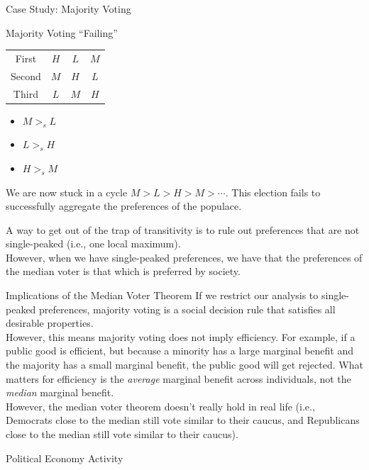 \documentclass[8pt]{extarticle}
\begin{document}
\begin{problem}{Case Study: Majority Voting}
\begin{problem}{Majority Voting ``Failing''}
\begin{center}
\begin{tabular}{c|c|c|c|}
          \cline{2-4}
          First & $H$ & $L$ & $M$\\
          \cline{2-4}
          Second & $M$ & $H$ & $L$\\
          \cline{2-4}
          Third & $L$ & $M$ & $H$\\
          \cline{2-4}
        \end{tabular}
      \end{center}
      \begin{itemize}
        \item $M >_s L$
        \item $L >_s H$
        \item $H >_s M$
      \end{itemize}
      We are now stuck in a cycle $M>L>H>M>\cdots$. This election fails to successfully aggregate the preferences of the populace.
    \end{problem}
    A way to get out of the trap of transitivity is to rule out preferences that are not single-peaked (i.e., one local maximum).\\

    However, when we have single-peaked preferences, we have that the preferences of the median voter is that which is preferred by society.
  \end{problem}
  \begin{problem}{Implications of the Median Voter Theorem}
    If we restrict our analysis to single-peaked preferences, majority voting is a social decision rule that satisfies all desirable properties.\\

    However, this means majority voting does not imply efficiency. For example, if a public good is efficient, but because a minority has a large marginal benefit and the majority has a small marginal benefit, the public good will get rejected. What matters for efficiency is the \textit{average} marginal benefit across individuals, not the \textit{median} marginal benefit.\\

    However, the median voter theorem doesn't really hold in real life (i.e., Democrats close to the median still vote similar to their caucus, and Republicans close to the median still vote similar to their caucus).
  \end{problem}
  \begin{problem}{Political Economy Activity}
    \begin{tcbraster}[raster columns = 1,colframe = black!75!white,colback=white]
    \end{tcbraster}
  \end{problem}
\end{document}
